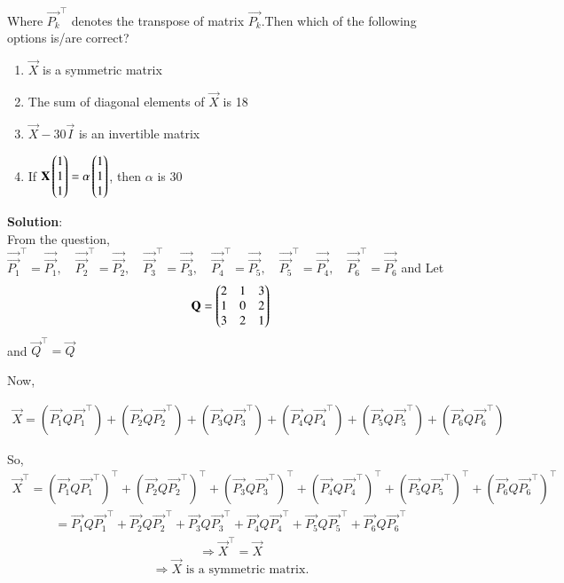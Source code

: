 \documentclass[journal]{IEEEtran}
\begin{document}
Where $\vec{P_k}^\top $ denotes the transpose of matrix $ \vec{P_k} $.Then which of the following options is/are correct? 
\begin{enumerate}
    \item $\vec{X}$ is a symmetric matrix
    \item The sum of diagonal elements of $\vec{X}$ is 18
    \item $\vec{X} - 30\vec{I}$ is an invertible matrix
    \item If $\mathbf{X}\begin{pmatrix}1\\1\\1\end{pmatrix}=\alpha\begin{pmatrix}1\\1\\1\end{pmatrix}$, then $\alpha$ is 30
\end{enumerate}
\textbf{Solution}:\\
From the question,
$
\vec{\vec{P_1}}^\top = \vec{\vec{P_1}}, \quad \vec{\vec{P_2}}^\top = \vec{\vec{P_2}}, \quad \vec{\vec{P_3}}^\top = \vec{\vec{P_3}}, \quad \vec{\vec{P_4}}^\top = \vec{\vec{P_5}}, \quad \vec{\vec{P_5}}^\top = \vec{\vec{P_4}}, \quad \vec{\vec{P_6}}^\top = \vec{\vec{P_6}}$
and Let 
\begin{align}
\mathbf{Q} = \begin{pmatrix}
2 & 1 & 3 \\
1 & 0 & 2 \\
3 & 2 & 1 \end{pmatrix}
\end{align}
and $ \vec{Q}^\top = \vec{Q}$

Now,

\begin{align}
\vec{X} = (\vec{P_1} Q \vec{P_1}^\top) + (\vec{P_2} Q \vec{P_2}^\top) + (\vec{P_3} Q \vec{P_3}^\top) + (\vec{P_4} Q \vec{P_4}^\top) + (\vec{P_5} Q \vec{P_5}^\top) + (\vec{P_6} Q \vec{P_6}^\top)
\end{align}

So,
\begin{align}
\vec{X}^\top = (\vec{P_1} Q \vec{P_1}^\top)^\top + (\vec{P_2} Q \vec{P_2}^\top)^\top + (\vec{P_3} Q \vec{P_3}^\top)^\top + (\vec{P_4} Q \vec{P_4}^\top)^\top + (\vec{P_5} Q \vec{P_5}^\top)^\top + (\vec{P_6} Q \vec{P_6}^\top)^\top
\end{align}
\begin{align}
= \vec{P_1} Q \vec{P_1}^\top + \vec{P_2} Q \vec{P_2}^\top + \vec{P_3} Q \vec{P_3}^\top + \vec{P_4} Q \vec{P_4}^\top + \vec{P_5} Q \vec{P_5}^\top + \vec{P_6} Q \vec{P_6}^\top
\end{align}
\begin{align}
\Rightarrow \vec{X}^\top = \vec{X}
\end{align}
$$
\Rightarrow \vec{X} \text{ is a symmetric matrix.}
$$
\end{document}
